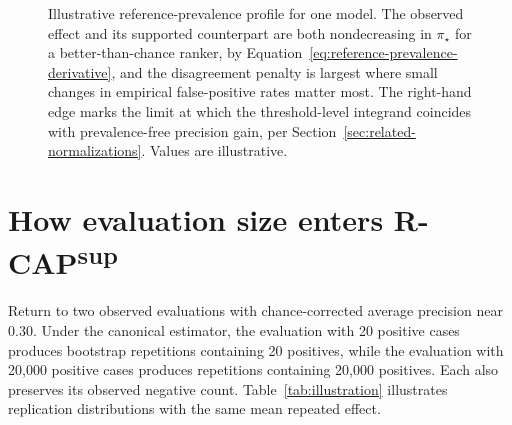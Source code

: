 \documentclass[11pt]{article}
\newcommand{\CAP}{\operatorname{CAP}}
\newcommand{\Tpi}{\CAP_{\pi_\star}}
\newcommand{\RCAPHat}{\widehat{\operatorname{R\text{-}CAP}}{}^{\,\mathrm{sup}}_{\pi_\star}}
\theoremstyle{remark}
\begin{document}
\begin{figure}[ht]
\centering
{}
\caption{Illustrative reference-prevalence profile for one model. The observed effect and its supported counterpart are both nondecreasing in $\pi_\star$ for a better-than-chance ranker, by Equation~\eqref{eq:reference-prevalence-derivative}, and the disagreement penalty is largest where small changes in empirical false-positive rates matter most. The right-hand edge marks the limit at which the threshold-level integrand coincides with prevalence-free precision gain, per Section~\ref{sec:related-normalizations}. Values are illustrative.}
\label{fig:profile}
\end{figure}

\section{How evaluation size enters R-CAP\textsuperscript{sup}}

Return to two observed evaluations with chance-corrected average precision near $0.30$. Under the canonical estimator, the evaluation with 20 positive cases produces bootstrap repetitions containing 20 positives, while the evaluation with 20,000 positive cases produces repetitions containing 20,000 positives. Each also preserves its observed negative count. Table~\ref{tab:illustration} illustrates replication distributions with the same mean repeated effect.
\end{document}
